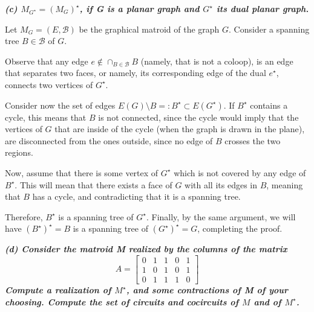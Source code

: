 \vspace{3pt}

\hspace{5pt} \textbf{\textit{(c) $M_{G^\star} = \left(M_G\right)^\star$, if G is a planar graph and $G^\star$ its dual planar graph.}}

\vspace{3pt}

Let $M_G = (E, \mathcal B)$ be the graphical matroid of the graph $G$. Consider a spanning tree $B \in \mathcal B$ of $G$.

Observe that any edge $e \notin \cap_{B \in \mathcal B} B$ (namely, that is not a coloop), is an edge that separates two faces, or namely, its corresponding edge of the dual $e^\star$, connects two vertices of $G^\star$. 

Consider now the set of edges $E(G) \setminus B =: B^\star \subset E(G^\star)$. If $B^\star$ contains a cycle, this means that $B$ is not connected, since the cycle would imply that the vertices of $G$ that are inside of the cycle (when the graph is drawn in the plane), are disconnected from the ones outside, since no edge of $B$ crosses the two regions.

Now, assume that there is some vertex of $G^\star$ which is not covered by any edge of $B^\star$. This will mean that there exists a face of $G$ with all its edges in $B$, meaning that $B$ has a cycle, and contradicting that it is a spanning tree.

Therefore, $B^\star$ is a spanning tree of $G^\star$. Finally, by the same argument, we will have $(B^\star)^\star = B$ is a spanning tree of $(G^\star)^\star = G$, completing the proof.
\vspace{3pt}

\hspace{5pt} \textbf{\textit{(d) Consider the matroid M realized by the columns of the matrix}}
$$
A = \left[
    \begin{array}{ccccc}
        0 & 1 & 1 & 0 & 1 \\
        1 & 0 & 1 & 0 & 1 \\
        0 & 1 & 1 & 1 & 0
    \end{array}
\right]
$$
\textbf{\textit{Compute a realization of $M^\star$, and some contractions of M of your choosing. Compute the set of circuits and cocircuits of $M$ and of $M^\star$.}}

\vspace{5pt}

